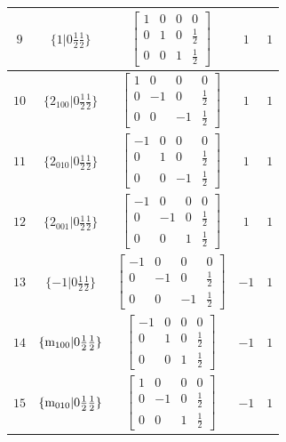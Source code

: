 \documentclass[fleqn,8pt]{jsarticle}
\begin{document}
\begin{longtable}{ccccc}
$ 9 $ & $ \{1|0 \frac{1}{2} \frac{1}{2}\} $ & $ \begin{bmatrix} 1 & 0 & 0 & 0 \\ 0 & 1 & 0 & \frac{1}{2} \\ 0 & 0 & 1 & \frac{1}{2} \end{bmatrix} $ & $ 1 $ & $ 1 $ \\ \hline
$ 10 $ & $ \{2{}_{100}|0 \frac{1}{2} \frac{1}{2}\} $ & $ \begin{bmatrix} 1 & 0 & 0 & 0 \\ 0 & -1 & 0 & \frac{1}{2} \\ 0 & 0 & -1 & \frac{1}{2} \end{bmatrix} $ & $ 1 $ & $ 1 $ \\ \hline
$ 11 $ & $ \{2{}_{010}|0 \frac{1}{2} \frac{1}{2}\} $ & $ \begin{bmatrix} -1 & 0 & 0 & 0 \\ 0 & 1 & 0 & \frac{1}{2} \\ 0 & 0 & -1 & \frac{1}{2} \end{bmatrix} $ & $ 1 $ & $ 1 $ \\ \hline
$ 12 $ & $ \{2{}_{001}|0 \frac{1}{2} \frac{1}{2}\} $ & $ \begin{bmatrix} -1 & 0 & 0 & 0 \\ 0 & -1 & 0 & \frac{1}{2} \\ 0 & 0 & 1 & \frac{1}{2} \end{bmatrix} $ & $ 1 $ & $ 1 $ \\ \hline
$ 13 $ & $ \{-1|0 \frac{1}{2} \frac{1}{2}\} $ & $ \begin{bmatrix} -1 & 0 & 0 & 0 \\ 0 & -1 & 0 & \frac{1}{2} \\ 0 & 0 & -1 & \frac{1}{2} \end{bmatrix} $ & $ -1 $ & $ 1 $ \\ \hline
$ 14 $ & $ \{{\rm m}_{100}|0 \frac{1}{2} \frac{1}{2}\} $ & $ \begin{bmatrix} -1 & 0 & 0 & 0 \\ 0 & 1 & 0 & \frac{1}{2} \\ 0 & 0 & 1 & \frac{1}{2} \end{bmatrix} $ & $ -1 $ & $ 1 $ \\ \hline
$ 15 $ & $ \{{\rm m}_{010}|0 \frac{1}{2} \frac{1}{2}\} $ & $ \begin{bmatrix} 1 & 0 & 0 & 0 \\ 0 & -1 & 0 & \frac{1}{2} \\ 0 & 0 & 1 & \frac{1}{2} \end{bmatrix} $ & $ -1 $ & $ 1 $ \\ \hline

\end{longtable}
\end{document}
